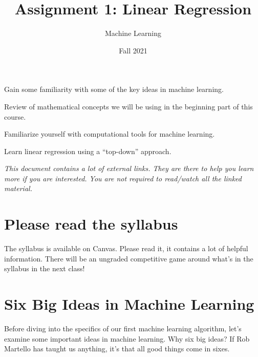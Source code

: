 \documentclass[assignment01_Solutions]{subfiles}
\title{Assignment 1: Linear Regression}
\author{Machine Learning}
\date{Fall 2021}
\begin{document}
\maketitle
\thispagestyle{firstpage}


\begin{learningobjectives}
\bi
\item Gain some familiarity with some of the key ideas in machine learning.
\item Review of mathematical concepts we will be using in the beginning part of this course.
\item Familiarize yourself with computational tools for machine learning.
\item Learn linear regression using a ``top-down'' approach.
\ei
\end{learningobjectives}

\emph{This document contains a lot of external links. They are there to help you learn more if you are interested. You are not required to read/watch all the linked material.}

\section{Please read the syllabus}
The syllabus is available on Canvas. Please read it, it contains a lot of helpful information. There will be an ungraded competitive game around what's in the syllabus in the next class!

\section{Six Big Ideas in Machine Learning}
Before diving into the specifics of our first machine learning algorithm, let's examine some important ideas in machine learning.  Why six big ideas?  If Rob Martello has taught us anything, it's that all good things come in sixes.
\end{document}
